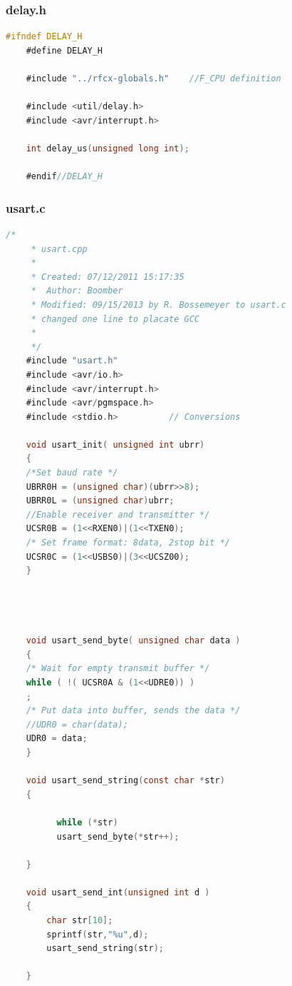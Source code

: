 \documentclass{article}
\numberwithin{figure}{section}
\numberwithin{equation}{section}
\begin{document}
{\subsubsection{delay.h}\label{sect:delay.h}
\begin{lstlisting}[language=C,label=lst:delay.h,caption=delay.h]
    #ifndef DELAY_H
    #define DELAY_H

    #include "../rfcx-globals.h"    //F_CPU definition

    #include <util/delay.h>
    #include <avr/interrupt.h>

    int delay_us(unsigned long int);

    #endif//DELAY_H
\end{lstlisting}

\subsubsection{usart.c}\label{sect:usart.c}
\begin{lstlisting}[language=C,label=lst:usart.c,caption=usart.c]
    /*
     * usart.cpp
     *
     * Created: 07/12/2011 15:17:35
     *  Author: Boomber
     * Modified: 09/15/2013 by R. Bossemeyer to usart.c
     * changed one line to placate GCC
     *
     */
    #include "usart.h"
    #include <avr/io.h>
    #include <avr/interrupt.h>
    #include <avr/pgmspace.h>
    #include <stdio.h>			// Conversions

    void usart_init( unsigned int ubrr)
    {
    /*Set baud rate */
    UBRR0H = (unsigned char)(ubrr>>8);
    UBRR0L = (unsigned char)ubrr;
    //Enable receiver and transmitter */
    UCSR0B = (1<<RXEN0)|(1<<TXEN0);
    /* Set frame format: 8data, 2stop bit */
    UCSR0C = (1<<USBS0)|(3<<UCSZ00);
    }




    void usart_send_byte( unsigned char data )
    {
    /* Wait for empty transmit buffer */
    while ( !( UCSR0A & (1<<UDRE0)) )
    ;
    /* Put data into buffer, sends the data */
    //UDR0 = char(data);
    UDR0 = data;
    }

    void usart_send_string(const char *str)
    {

    	  while (*str)
          usart_send_byte(*str++);

    }

    void usart_send_int(unsigned int d )
    {
    	char str[10];
    	sprintf(str,"%u",d);
    	usart_send_string(str);

    }




\end{lstlisting}}
\end{document}

